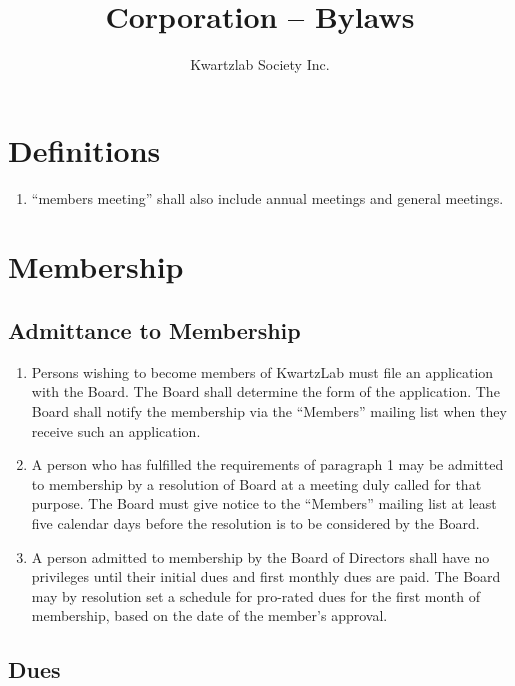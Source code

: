 \documentclass{article}
\title{Corporation – Bylaws}
\author{Kwartzlab Society Inc.}
\date{}
\begin{document}
\renewcommand{\thesection}{\Roman{section}}
\renewcommand{\thesubsection}{\Alph{subsection}}

\maketitle

\section{Definitions}

\begin{enumerate}
\item ``members meeting'' shall also include annual meetings and general meetings.
\end{enumerate}

\section{Membership}

\subsection{Admittance to Membership}

\begin{enumerate}
\item Persons wishing to become members of KwartzLab must file an application with the Board. The Board shall determine the form of the application. The Board shall notify the membership via the ``Members'' mailing list when they receive such an application.
\item A person who has fulfilled the requirements of paragraph 1 may be admitted to membership by a resolution of Board at a meeting duly called for that purpose. The Board must give notice to the ``Members'' mailing list at least five calendar days before the resolution is to be considered by the Board.
\item A person admitted to membership by the Board of Directors shall have no privileges until their initial dues and first monthly dues are paid. The Board may by resolution set a schedule for pro-rated dues for the first month of membership, based on the date of the member's approval.
\end{enumerate}

\subsection{Dues}
\end{document}
